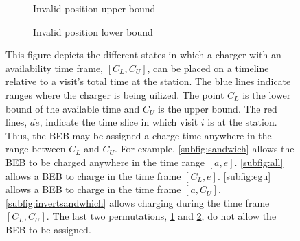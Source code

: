 \documentclass[11pt,a4paper,final]{article}
\begin{document}
\begin{figure}
\par\bigskip

\begin{subfigure}{\textwidth}
    \centering
    \caption{Invalid position upper bound}
    \label{subfig:invalid-upper}
\end{subfigure}

\par\bigskip

\begin{subfigure}{\textwidth}
    \centering
    \caption{Invalid position lower bound}
    \label{subfig:invalid-lower}
\end{subfigure}

\caption{This figure depicts the different states in which a charger with an availability time frame, $[C_L,C_U]$, can be placed on a timeline relative to a visit's total time at the station. The blue lines indicate ranges where the charger is being uilized. The point $C_L$ is the lower bound of the available time and $C_U$ is the upper bound. The red lines, $\bar{ae}$, indicate the time slice in which visit $i$ is at the station. Thus, the BEB may be assigned a charge time anywhere in the range between $C_L$ and $C_U$. For example, \ref{subfig:sandwich} allows the BEB to be charged anywhere in the time range $[a, e]$. \ref{subfig:all} allows a BEB to charge in the time frame $[C_L,e]$. \ref{subfig:egu} allows a BEB to charge in the time frame $[a,C_U]$. \ref{subfig:invertsandwhich} allows charging during the time frame $[C_L,C_U]$. The last two permutations, \ref{subfig:invalid-upper} and \ref{subfig:invalid-lower}, do not allow the BEB to be assigned.}
\label{fig:find-free}
\end{figure}
\end{document}
